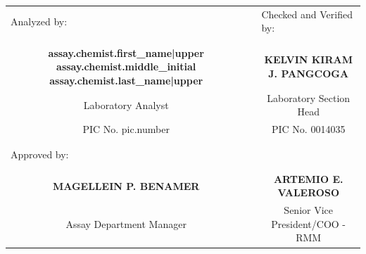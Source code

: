 \documentclass[10pt]{article}
\begin{document}
\begin{tabularx}{0.95\linewidth}{@{}cXc@{}}
    \multicolumn{1}{l}{Analyzed by:}
        && \multicolumn{1}{l}{Checked and Verified by:} \\
    && \\ && \\
    \bfseries {{ assay.chemist.first_name|upper }} {{ assay.chemist.middle_initial }} {{ assay.chemist.last_name|upper }}
        && \bfseries KELVIN KIRAM J. PANGCOGA \\
    Laboratory Analyst
        && Laboratory Section Head \\
    PIC No. {{ pic.number }}
        && PIC No. 0014035 \\
    && \\ && \\
    \multicolumn{3}{l}{Approved by:} \\
    && \\ && \\
    \bfseries MAGELLEIN P. BENAMER
        && \bfseries ARTEMIO E. VALEROSO \\
    Assay Department Manager
        && Senior Vice President/COO - RMM \\
\end{tabularx}
\end{document}
